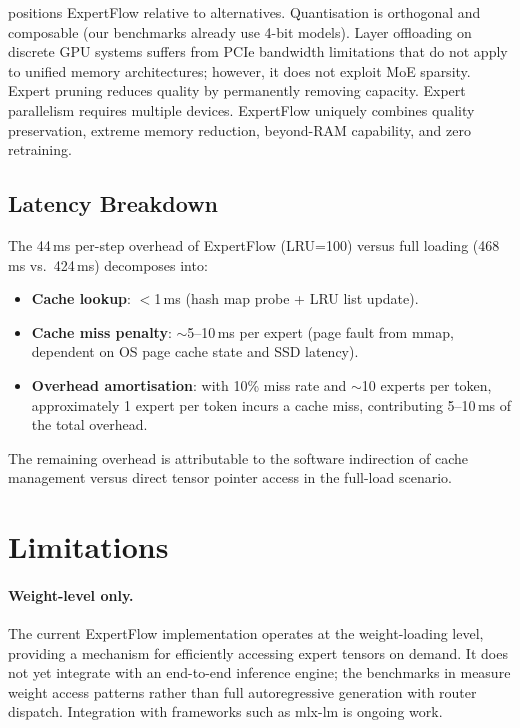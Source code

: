 \documentclass[11pt,a4paper]{article}
\begin{document}
 positions ExpertFlow relative to alternatives.
Quantisation is orthogonal and composable (our benchmarks already use 4-bit
models). Layer offloading on discrete GPU systems suffers from PCIe bandwidth
limitations that do not apply to unified memory architectures; however, it does
not exploit MoE sparsity. Expert pruning reduces quality by permanently
removing capacity. Expert parallelism requires multiple devices. ExpertFlow
uniquely combines quality preservation, extreme memory reduction, beyond-RAM
capability, and zero retraining.

\subsection{Latency Breakdown}
\label{sec:analysis:latency}

The 44\,ms per-step overhead of ExpertFlow (LRU=100) versus full loading
(468\,ms vs.\ 424\,ms) decomposes into:
\begin{itemize}[nosep]
  \item \textbf{Cache lookup}: $<$1\,ms (hash map probe + LRU list update).
  \item \textbf{Cache miss penalty}: $\sim$5--10\,ms per expert (page fault
    from mmap, dependent on OS page cache state and SSD latency).
  \item \textbf{Overhead amortisation}: with 10\% miss rate and
    $\sim$10 experts per token, approximately 1 expert per token incurs a
    cache miss, contributing 5--10\,ms of the total overhead.
\end{itemize}

The remaining overhead is attributable to the software indirection of cache
management versus direct tensor pointer access in the full-load scenario.

\section{Limitations}
\label{sec:limitations}

\paragraph{Weight-level only.} The current ExpertFlow implementation operates
at the weight-loading level, providing a mechanism for efficiently accessing
expert tensors on demand. It does not yet integrate with an end-to-end
inference engine; the benchmarks in  measure
weight access patterns rather than full autoregressive generation with router
dispatch. Integration with frameworks such as mlx-lm is ongoing work.
\end{document}
